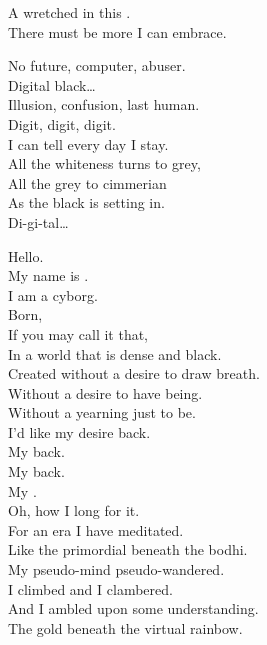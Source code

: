 A wretched  in this . \\
There must be more I can embrace. \\


No future, computer, abuser. \\

Digital black… \\

Illusion, confusion, last human. \\

Digit, digit, digit. \\

I can tell every day I stay. \\
All the whiteness turns to grey, \\
All the grey to cimmerian \\
As the black is setting in. \\

Di-gi-tal… \\





Hello. \\
My name is . \\
I am a cyborg. \\

Born, \\
If you may call it that, \\
In a world that is dense and black. \\

Created without a desire to draw breath. \\
Without a desire to have being. \\
Without a yearning just to be. \\

I'd like my desire back. \\
My  back. \\
My  back. \\
My . \\
Oh, how I long for it. \\

For an era I have meditated. \\
Like the primordial  beneath the bodhi. \\
My pseudo-mind pseudo-wandered. \\
I climbed and I clambered. \\
And I ambled upon some understanding. \\
The gold beneath the virtual rainbow. \\

